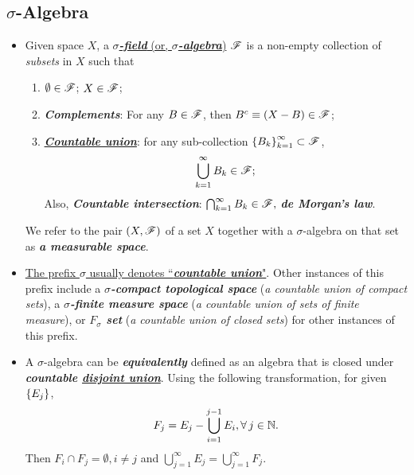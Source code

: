 \documentclass[11pt]{article}
\begin{document}
\subsection{$\sigma$-Algebra}
\begin{itemize}
\item
\begin{definition}
 Given space $X$, a \underline{\emph{\textbf{$\sigma$-field}} (or, \emph{\textbf{$\sigma$-algebra}})} ${\mathscr F}$ is a non-empty collection of \emph{subsets} in $X$ such that 
\begin{enumerate}
\item $\emptyset \in {\mathscr F}$; $X\in {\mathscr F}$;
\item \emph{\textbf{Complements}}:  For any $B\in {\mathscr F}$, then $B^{c}\equiv (X-B) \in {\mathscr F}$;
\item \underline{\emph{\textbf{Countable union}}}: for any sub-collection $\left\{B_{k}\right\}_{k=1}^{\infty} \subset {\mathscr F}$, 
\begin{align*}
\bigcup_{k=1}^{\infty}B_{k} \in {\mathscr F};
\end{align*} 
Also, \emph{\textbf{Countable intersection}}: $\bigcap_{k=1}^{\infty}B_{k} \in {\mathscr F},$ \emph{\textbf{de Morgan's law}}.
\end{enumerate} 
We refer to the pair $(X, {\mathscr F})$ of a set $X$ together with a $\sigma$-algebra on that set as \emph{\textbf{a measurable space}}.
\end{definition}

\item \begin{remark}
\underline{The prefix $\sigma$ usually denotes ``\emph{\textbf{countable union}}"}. Other instances of this prefix include a \emph{\textbf{$\sigma$-compact topological space}} (\emph{a countable union of compact sets}), a \emph{\textbf{$\sigma$-finite measure space}} (\emph{a countable union of sets of finite measure}), or \emph{\textbf{$F_{\sigma}$ set}} (\emph{a countable union of closed sets}) for other instances of this prefix.
\end{remark}

\item \begin{remark}
A $\sigma$-algebra can be \emph{\textbf{equivalently}} defined as an algebra that is closed under \emph{\textbf{countable \underline{disjoint union}}}. Using the following transformation, for given $\left\{E_{j}\right\} $, 
\begin{align*}
F_{j} = E_{j} - \bigcup_{i=1}^{j-1}E_{i}, \forall\, j\in {\mathbb N}.
\end{align*} Then $F_{i}\cap F_{j} = \emptyset, i\neq j$ and $\bigcup_{j=1}^{\infty}E_{j} = \bigcup_{j=1}^{\infty}F_{j}$.
\end{remark}


\end{itemize}
\end{document}

